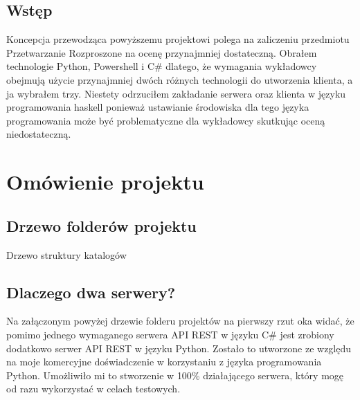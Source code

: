 \subsection{Wstęp}
\begin{spacing}{1.5} %
\end{spacing} %
    Koncepcja przewodząca powyższemu projektowi polega na zaliczeniu przedmiotu Przetwarzanie Rozproszone na ocenę przynajmniej dostateczną. Obrałem technologie Python, Powershell i C\# dlatego, że wymagania wykładowcy obejmują użycie przynajmniej dwóch różnych technologii do utworzenia klienta, a ja wybrałem trzy. Niestety odrzuciłem zakładanie serwera oraz klienta w języku programowania haskell ponieważ ustawianie środowiska dla tego języka programowania może być problematyczne dla wykładowcy skutkując oceną niedostateczną.

\section{Omówienie projektu}
\subsection{Drzewo folderów projektu}
\begin{spacing}{1.5} %
\end{spacing} %
\begin{table}[ht]
\centering
\caption{Drzewo struktury katalogów}
\label{tab:moja_struktura_katalogow}
\end{table}

\subsection{Dlaczego dwa serwery?}
\begin{spacing}{1.5} %
\end{spacing} %
    Na załączonym powyżej drzewie folderu projektów na pierwszy rzut oka widać, że pomimo jednego wymaganego serwera API REST w języku C\# jest zrobiony dodatkowo serwer API REST w języku Python. Zostało to utworzone ze względu na moje komercyjne doświadczenie w korzystaniu z języka programowania Python. Umożliwiło mi to stworzenie w 100\% działającego serwera, który mogę od razu wykorzystać w celach testowych.

